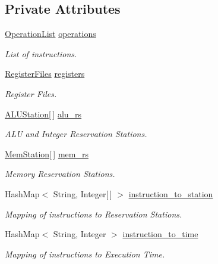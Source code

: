 \subsection*{\-Private \-Attributes}
\begin{DoxyCompactItemize}
\item 
\hyperlink{classOperationList}{\-Operation\-List} \hyperlink{classSimulation_a9569c59ef6447bb109d924ab08b952db}{operations}
\begin{DoxyCompactList}\small\item\em \-List of instructions. \end{DoxyCompactList}\item 
\hyperlink{classRegisterFiles}{\-Register\-Files} \hyperlink{classSimulation_a72082ebb1736f61f976fb4795c6446a6}{registers}
\begin{DoxyCompactList}\small\item\em \-Register \-Files. \end{DoxyCompactList}\item 
\hyperlink{classALUStation}{\-A\-L\-U\-Station}\mbox{[}$\,$\mbox{]} \hyperlink{classSimulation_a088d8379681674f73ff28d67fa15c4b1}{alu\-\_\-rs}
\begin{DoxyCompactList}\small\item\em \-A\-L\-U and \-Integer \-Reservation \-Stations. \end{DoxyCompactList}\item 
\hyperlink{classMemStation}{\-Mem\-Station}\mbox{[}$\,$\mbox{]} \hyperlink{classSimulation_a2d7653a8b926b1950e545b4ddf99525a}{mem\-\_\-rs}
\begin{DoxyCompactList}\small\item\em \-Memory \-Reservation \-Stations. \end{DoxyCompactList}\item 
\-Hash\-Map$<$ \-String, \-Integer\mbox{[}$\,$\mbox{]} $>$ \hyperlink{classSimulation_aa1da0fd99a66e4f3290cab75db0498ba}{instruction\-\_\-to\-\_\-station}
\begin{DoxyCompactList}\small\item\em \-Mapping of instructions to \-Reservation \-Stations. \end{DoxyCompactList}\item 
\-Hash\-Map$<$ \-String, \-Integer $>$ \hyperlink{classSimulation_aefb6ae75923bda2ea63a2789c6ea1387}{instruction\-\_\-to\-\_\-time}
\begin{DoxyCompactList}\small\item\em \-Mapping of instructions to \-Execution \-Time. \end{DoxyCompactList}\item 

\end{DoxyCompactItemize}
